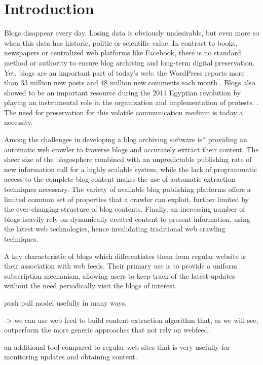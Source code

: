 \section{Introduction}

Blogs disappear every day. Losing data is obviously undesirable, but even more so when this data has historic, politic or scientific value. In contrast to books, newspapers or centralized web platforms like Facebook, there is no standard method or authority to ensure blog archiving and long-term digital preservation. Yet, blogs are an important part of today's web: the WordPress reports more than 33 million new posts and 48 million new comments each month \cite{wordpress2014}. Blogs also showed to be an important resource during the 2011 Egyptian revolution by playing an instrumental role in the organization and implementation of protests. \cite{nahedeltantawy2012}. The need for preservation for this volatile communication medium is today a necessity.

Among the challenges in developing a blog archiving software is* providing an automatic web crawler to  traverse blogs and accurately extract their content. The sheer size of the blogosphere combined with an unpredictable publishing rate of new information call for a highly scalable system, while the lack of programmatic access to the complete blog content makes the use of automatic extraction techniques necessary. The variety of available blog publishing platforms offers a limited common set of properties that a crawler can exploit, further limited by the ever-changing structure of blog contents. Finally, an increasing number of blogs heavily rely on dynamically created content to present information, using the latest web technologies, hence invalidating traditional web crawling techniques.

A key characteristic of blogs which differentiates them from regular website is their association with web feeds. Their primary use is to provide a uniform subscription mechanism, allowing users to keep track of the latest updates without the need periodically visit the blogs of interest. 

push pull model
usefully in many ways, 

-> we can use web feed to build content extraction algorithm that, as we will see, outperform the more generic approaches that not rely on webfeed.

an additional tool compared to regular web sites that is very usefully for monitoring updates and obtaining content.

